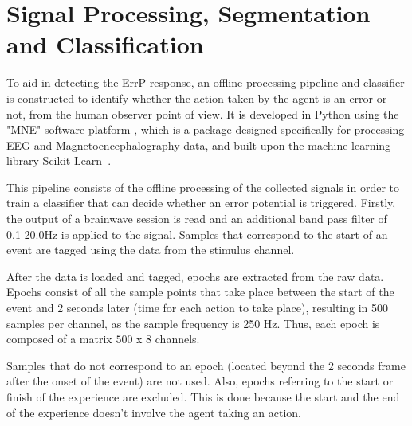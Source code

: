 \documentclass[journal]{IEEEtran}
\begin{document}
{%


\section{Signal Processing, Segmentation and Classification}
\label{section:calibration}

To aid in detecting the ErrP response, an offline processing pipeline and classifier is constructed to identify whether the action taken by the agent is an error or not, from the human observer point of view. It is developed in Python using the "MNE" software platform \cite{MNE-PYTHON}, which is a package designed specifically for processing EEG and Magnetoencephalography data, and built upon the machine learning library Scikit-Learn~\cite{scikit-learn}.

This pipeline consists of the offline processing of the collected signals in order to train a classifier that can decide whether an error potential is triggered. Firstly, the output of a brainwave session is read and an additional band pass filter of 0.1-20.0Hz is applied to the signal. Samples that correspond to the start of an event are tagged using the data from the stimulus channel.

After the data is loaded and tagged, epochs are extracted from the raw data. Epochs consist of all the sample points that take place between the start of the event and 2 seconds later (time for each action to take place), resulting in 500 samples per channel, as the sample frequency is 250 Hz. Thus, each epoch is composed of a matrix $500$ x $8$ channels.

Samples that do not correspond to an epoch (located beyond the 2 seconds frame after the onset of the event) are not used. Also, epochs referring to the start or finish of the experience are excluded. This is done because the start and the end of the experience doesn't involve the agent taking an action.

}
\end{document}
